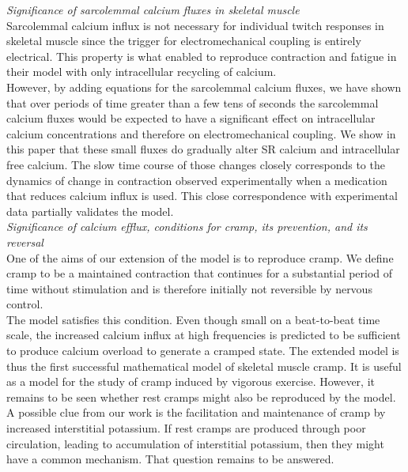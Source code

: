 \documentclass[fleqn,10pt]{physiome}
\begin{document}
\textit{Significance of sarcolemmal calcium fluxes in skeletal muscle}\\\newline
Sarcolemmal calcium influx is not necessary for individual twitch responses in skeletal muscle since the trigger for electromechanical coupling is entirely electrical. This property is what enabled \cite{shorten2007mathematical} to reproduce contraction and fatigue in their model with only intracellular recycling of calcium.\\\newline 
However, by adding equations for the sarcolemmal calcium fluxes, we have shown that over periods of time greater than a few tens of seconds the sarcolemmal calcium fluxes would be expected to have a significant effect on intracellular calcium concentrations and therefore on electromechanical coupling. We show in this paper that these small fluxes do gradually alter SR calcium and intracellular free calcium. The slow time course of those changes closely corresponds to the dynamics of change in contraction observed experimentally when a medication that reduces calcium influx is used. This close correspondence with experimental data partially validates the model.\\\newline
\textit{Significance of calcium efflux, conditions for cramp, its prevention, and its reversal}\\\newline
One of the aims of our extension of the model is to reproduce cramp. We define cramp to be a maintained contraction that continues for a substantial period of time without stimulation and is therefore initially not reversible by nervous control.\\\newline 
The model satisfies this condition. Even though small on a beat-to-beat time scale, the increased calcium influx at high frequencies is predicted to be sufficient to produce calcium overload to generate a cramped state. The extended model is thus the first successful mathematical model of skeletal muscle cramp. It is useful as a model for the study of cramp induced by vigorous exercise. However, it remains to be seen whether rest cramps might also be reproduced by the model. A possible clue from our work is the facilitation and maintenance of cramp by increased interstitial potassium. If rest cramps are produced through poor circulation, leading to accumulation of interstitial potassium, then they might have a common mechanism. That question remains to be answered.\\\newline
\end{document}
